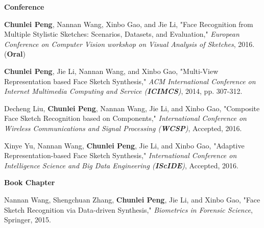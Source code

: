 \documentclass[11pt]{article}
\begin{document}
\vspace{0.2in}


\textbf{Conference}

\vspace{0.1in}

\begin{bibenum}
\item \textbf{Chunlei Peng}, Nannan Wang, Xinbo Gao, and Jie Li, "Face Recognition from Multiple Stylistic Sketches: Scenarios, Datasets, and Evaluation," \emph{European Conference on Computer Vision workshop on Visual Analysis of Sketches}, 2016. (\textbf{Oral})

\item \textbf{Chunlei Peng}, Jie Li, Nannan Wang, and Xinbo Gao, "Multi-View Representation based Face Sketch Synthesis," \emph{ACM International Conference on Internet Multimedia Computing and Service (\textbf{ICIMCS})}, 2014, pp. 307-312.

\item Decheng Liu, \textbf{Chunlei Peng}, Nannan Wang, Jie Li, and Xinbo Gao, "Composite Face Sketch Recognition based on Components," \emph{International Conference on
Wireless Communications and Signal Processing (\textbf{WCSP})}, Accepted, 2016.

\item Xinye Yu, Nannan Wang, \textbf{Chunlei Peng}, Jie Li, and Xinbo Gao, "Adaptive Representation-based Face Sketch Synthesis," \emph{International Conference on Intelligence Science and Big Data Engineering (\textbf{IScIDE})}, Accepted, 2016.

\end{bibenum}

\vspace{0.2in}


\textbf{Book Chapter}

\vspace{0.1in}

\begin{bibenum}
\item Nannan Wang, Shengchuan Zhang, \textbf{Chunlei Peng}, Jie Li, and Xinbo Gao, "Face Sketch Recognition via Data-driven Synthesis," \emph{Biometrics in Forensic Science}, Springer, 2015.

\end{bibenum}

\vspace{0.2in}
\end{document}
